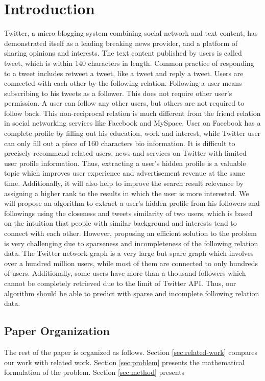 \section{Introduction}

Twitter, a micro-blogging system combining social network and text content, has demonstrated itself as a leading breaking news provider, and a platform of sharing opinions and interests. The text content published by users is called tweet, which is within 140 characters in length. Common practice of responding to a tweet includes retweet a tweet, like a tweet and reply a tweet. Users are connected with each other by the following relation. Following a user means subscribing to his tweets as a follower. This does not require other user's permission. A user can follow any other users, but others are not required to follow back. This non-reciprocal relation is much different from the friend relation in social networking services like Facebook and MySpace.
User on Facebook has a complete profile by filling out his education, work and interest, while Twitter user can only fill out a piece of 160 characters bio information. It is difficult to precisely recommend related users, news and services on Twitter with limited user profile information. Thus, extracting a user's hidden profile is a valuable topic which improves user experience and advertisement revenue at the same time. Additionally, it will also help to improve the search result relevance by assigning a higher rank to the results in which the user is more interested.
We will propose an algorithm to extract a user's hidden profile from his followers and followings using the closeness and tweets similarity of two users, which is based on the intuition that people with similar background and interests tend to connect with each other.
However, proposing an efficient solution to the problem is very challenging due to sparseness and incompleteness of the following relation data. The Twitter network graph is a very large but spare graph which involves over a hundred million users, while most of them are connected to only hundreds of users. Additionally, some users have more than a thousand followers which cannot be completely retrieved due to the limit of Twitter API. Thus, our algorithm should be able to predict with sparse and incomplete following relation data.


\subsection{Paper Organization}

The rest of the paper is organized as follows.  Section
\ref{sec:related-work} compares our work with related work.  Section
\ref{sec:problem} presents the mathematical formulation of the
problem.  Section \ref{sec:method} presents

